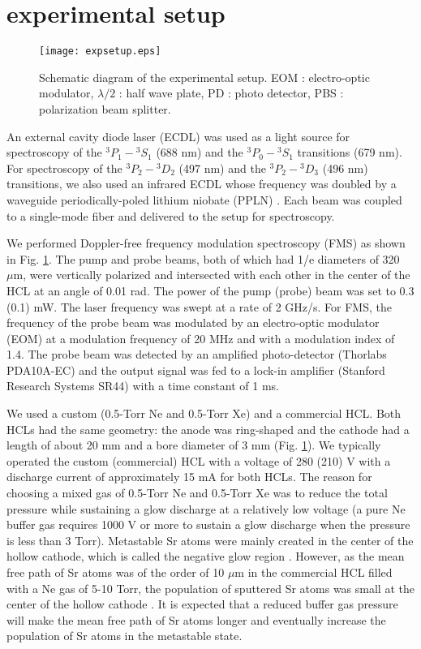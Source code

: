 \documentclass[twocolumn,10pt,a4paper]{article}
\begin{document}
\section{experimental setup}

\begin{figure}[t]
	\begin{center}
		\texttt{[image: expsetup.eps]}
		\caption{Schematic diagram of the experimental setup. EOM : electro-optic modulator, $\lambda/2$ : half wave plate, PD : photo detector, PBS : polarization beam splitter.}
		\label{fig:expsetup}
	\end{center}
\end{figure}

 An external cavity diode laser (ECDL) was used as a light source for spectroscopy of the ${}^3P_1-{}^3S_1$ (688 nm) and the ${}^3P_0-{}^3S_1$ transitions (679 nm). For spectroscopy of the ${}^3P_2-{}^3D_2$ (497 nm) and the ${}^3P_2-{}^3D_3$ (496 nm) transitions, we also used an infrared ECDL whose frequency was doubled by a waveguide periodically-poled lithium niobate (PPLN) \cite{Akamatsu:11}. Each beam was coupled to a single-mode fiber and delivered to the setup for spectroscopy.


We performed Doppler-free frequency modulation spectroscopy (FMS) \cite{FMS1,FMS2} as shown in Fig. \ref{fig:expsetup}. The pump and probe beams, both of which had 1/e diameters of 320 $\mu \mathrm{m}$, were vertically polarized and intersected with each other in the center of the HCL at an angle of 0.01 rad. The power of the pump (probe) beam was set to 0.3 (0.1) mW. The laser frequency was swept at a rate of 2 GHz/s. For FMS, the frequency of the probe beam was modulated by an electro-optic modulator (EOM) at a modulation frequency of 20 MHz and with a modulation index of 1.4. The probe beam was detected by an amplified photo-detector (Thorlabs PDA10A-EC) and the output signal was fed to a lock-in amplifier (Stanford Research Systems SR44) with a time constant of 1 ms.

We used a custom (0.5-Torr Ne and 0.5-Torr Xe) and a commercial HCL. Both HCLs had the same geometry: the anode was ring-shaped and the cathode had a length of about 20 mm and a bore diameter of 3 mm (Fig. \ref{fig:expsetup}). We typically operated the custom (commercial) HCL with a voltage of 280 (210) V with a discharge current of approximately 15 mA for both HCLs. The reason for choosing a mixed gas of 0.5-Torr Ne and 0.5-Torr Xe was to reduce the total pressure while sustaining a glow discharge at a relatively low voltage (a pure Ne buffer gas requires 1000 V or more to sustain a glow discharge when the pressure is less than 3 Torr). Metastable Sr atoms were mainly created in the center of the hollow cathode, which is called the negative glow region \cite{hollowcathode}. However, as the mean free path of Sr atoms was of the order of 10 $\mu$m  in the commercial HCL filled with a Ne gas of 5-10 Torr, the population of sputtered Sr atoms was small at the center of the hollow cathode \cite{simple461nmlasersystem}. It is expected that a reduced buffer gas pressure will make the mean free path of Sr atoms longer and eventually increase the population of Sr atoms in the metastable state.
\end{document}
